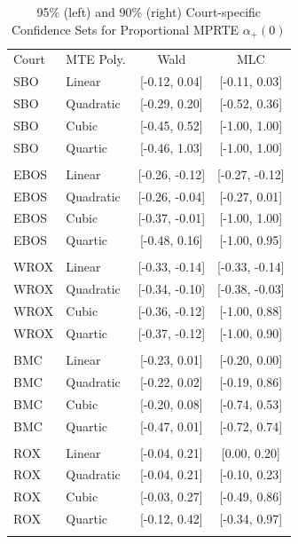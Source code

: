 \documentclass[11pt]{article}
\theoremstyle{definition}
\newcommand{\0}{\ensuremath{\mathbf{0}}}
\begin{document}
\begin{bibunit}
\begin{table}[htbp]
	\scriptsize
  \centering
  \caption{95\% (left) and 90\% (right) Court-specific Confidence Sets for Proportional MPRTE ${\alpha}_+(0)$}
    \begin{tabular}{llcc}
		\toprule
    Court & MTE Poly. & Wald  & MLC \\
    SBO   & Linear  & [-0.12, 0.04] & [-0.11, 0.03] \\
    SBO   & Quadratic  & [-0.29, 0.20] & [-0.52, 0.36] \\
    SBO   & Cubic  & [-0.45, 0.52] & [-1.00, 1.00] \\
    SBO   & Quartic  & [-0.46, 1.03] & [-1.00, 1.00] \\
          &       &       &  \\
    EBOS  & Linear  & [-0.26, -0.12] & [-0.27, -0.12] \\
    EBOS  & Quadratic  & [-0.26, -0.04] & [-0.27, 0.01] \\
    EBOS  & Cubic  & [-0.37, -0.01] & [-1.00, 1.00] \\
    EBOS  & Quartic  & [-0.48, 0.16] & [-1.00, 0.95] \\
          &       &       &  \\
    WROX  & Linear  & [-0.33, -0.14] & [-0.33, -0.14] \\
    WROX  & Quadratic  & [-0.34, -0.10] & [-0.38, -0.03] \\
    WROX  & Cubic  & [-0.36, -0.12] & [-1.00, 0.88] \\
    WROX  & Quartic  & [-0.37, -0.12] & [-1.00, 0.90] \\
          &       &       &  \\
    BMC   & Linear  & [-0.23, 0.01] & [-0.20, 0.00] \\
    BMC   & Quadratic  & [-0.22, 0.02] & [-0.19, 0.86] \\
    BMC   & Cubic  & [-0.20, 0.08] & [-0.74, 0.53] \\
    BMC   & Quartic  & [-0.47, 0.01] & [-0.72, 0.74] \\
          &       &       &  \\
    ROX   & Linear  & [-0.04, 0.21] & [0.00, 0.20] \\
    ROX   & Quadratic  & [-0.04, 0.21] & [-0.10, 0.23] \\
    ROX   & Cubic  & [-0.03, 0.27] & [-0.49, 0.86] \\
    ROX   & Quartic  & [-0.12, 0.42] & [-0.34, 0.97] \\
          &       &       &  \\

\end{tabular}
\end{table}
\end{bibunit}
\end{document}
